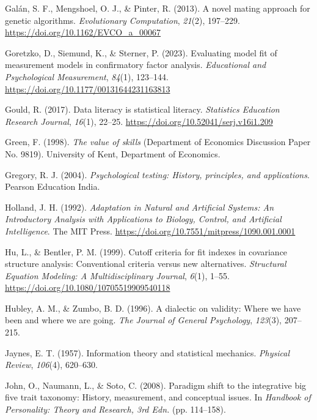 \documentclass[
  12pt,
  a4paper,
  twoside]{article}
\newlength{\cslhangindent}
\newenvironment{CSLReferences}[2] %
 {\begin{list}{}{%
  \setlength{\itemindent}{0pt}
  \setlength{\leftmargin}{0pt}
  \setlength{\parsep}{0pt}
  \ifodd #1
   \setlength{\leftmargin}{\cslhangindent}
   \setlength{\itemindent}{-1\cslhangindent}
  \fi
  \setlength{\itemsep}{#2\baselineskip}}}
 {\end{list}}
\begin{document}
\begin{CSLReferences}{1}{0}
Galán, S. F., Mengshoel, O. J., \& Pinter, R. (2013). A novel mating approach for genetic algorithms. \emph{Evolutionary Computation}, \emph{21}(2), 197--229. \url{https://doi.org/10.1162/EVCO_a_00067}

Goretzko, D., Siemund, K., \& Sterner, P. (2023). Evaluating model fit of measurement models in confirmatory factor analysis. \emph{Educational and Psychological Measurement}, \emph{84}(1), 123--144. \url{https://doi.org/10.1177/00131644231163813}

Gould, R. (2017). Data literacy is statistical literacy. \emph{Statistics Education Research Journal}, \emph{16}(1), 22--25. \url{https://doi.org/10.52041/serj.v16i1.209}

Green, F. (1998). \emph{The value of skills} (Department of Economics Discussion Paper No. 9819). University of Kent, Department of Economics.

Gregory, R. J. (2004). \emph{Psychological testing: History, principles, and applications}. Pearson Education India.

Holland, J. H. (1992). \emph{{Adaptation in Natural and Artificial Systems: An Introductory Analysis with Applications to Biology, Control, and Artificial Intelligence}}. The MIT Press. \url{https://doi.org/10.7551/mitpress/1090.001.0001}

Hu, L., \& Bentler, P. M. (1999). Cutoff criteria for fit indexes in covariance structure analysis: Conventional criteria versus new alternatives. \emph{Structural Equation Modeling: A Multidisciplinary Journal}, \emph{6}(1), 1--55. \url{https://doi.org/10.1080/10705519909540118}

Hubley, A. M., \& Zumbo, B. D. (1996). A dialectic on validity: Where we have been and where we are going. \emph{The Journal of General Psychology}, \emph{123}(3), 207--215.

Jaynes, E. T. (1957). Information theory and statistical mechanics. \emph{Physical Review}, \emph{106}(4), 620--630.

John, O., Naumann, L., \& Soto, C. (2008). Paradigm shift to the integrative big five trait taxonomy: History, measurement, and conceptual issues. In \emph{Handbook of Personality: Theory and Research, 3rd Edn.} (pp. 114--158).


\end{CSLReferences}
\end{document}
